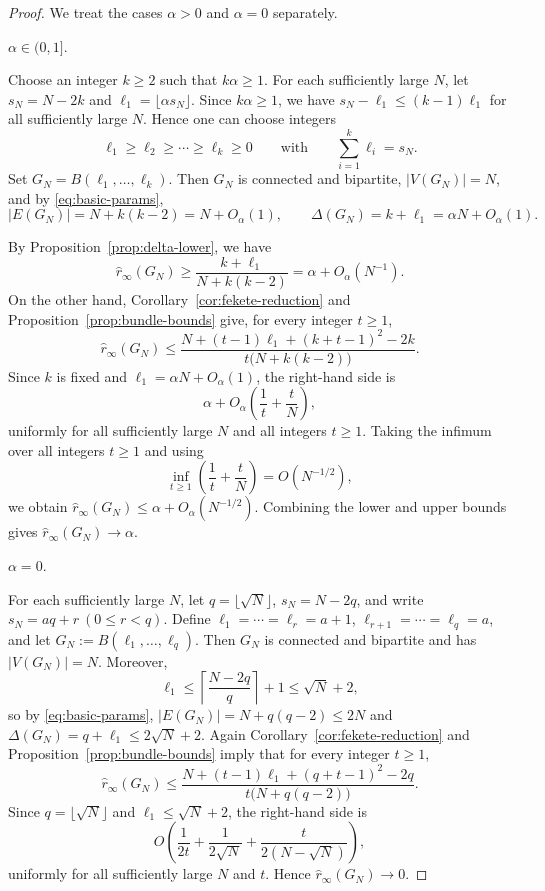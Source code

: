 \documentclass[10pt,a4paper]{amsart}
\newcommand{\sri}{\hat r_{\infty}}
\begin{document}
\begin{proof}
We treat the cases $\alpha>0$ and $\alpha=0$ separately.
\setcounter{case}{0}
\begin{case}
$\alpha\in(0,1]$.    
\end{case}

Choose an integer $k\ge 2$ such that $k\alpha \geq 1$. For each sufficiently large $N$, let
$s_N=N-2k$ and 
$\ell_1=\lfloor \alpha s_N\rfloor$.
Since $k\alpha \geq 1$, we have $s_N-\ell_1\le (k-1)\ell_1$ for all sufficiently large $N$. Hence
one can choose integers
\[
\ell_1\ge \ell_2\ge \cdots\ge \ell_k\ge 0
\qquad\text{with}\qquad
\sum_{i=1}^k\ell_i=s_N.
\]
Set
$G_N=B(\ell_1,\dots,\ell_k)$.
Then $G_N$ is connected and bipartite, $|V(G_N)|=N$, and by \eqref{eq:basic-params},
\[
|E(G_N)|=N+k(k-2)=N+O_{\alpha}(1),
\qquad
\Delta(G_N)=k+\ell_1=\alpha N+O_{\alpha}(1).
\]

By Proposition~\ref{prop:delta-lower}, we have 
\[
\sri(G_N)\ge \frac{k+\ell_1}{N+k(k-2)}=\alpha+O_{\alpha}(N^{-1}).
\]
On the other hand, Corollary~\ref{cor:fekete-reduction} and
Proposition~\ref{prop:bundle-bounds} give, for every integer $t\ge 1$,
\[
\sri(G_N)
\le
\frac{N+(t-1)\ell_1+(k+t-1)^2-2k}{t\bigl(N+k(k-2)\bigr)}.
\]
Since $k$ is fixed and $\ell_1=\alpha N+O_{\alpha}(1)$, the right-hand side is
\[
\alpha+O_{\alpha}\!\left(\frac{1}{t}+\frac{t}{N}\right),
\]
uniformly for all sufficiently large $N$ and all integers $t\ge 1$. Taking the infimum over
all integers $t\ge 1$ and using
\[
\inf_{t\ge 1}\left(\frac{1}{t}+\frac{t}{N}\right)=O(N^{-1/2}),
\]
we obtain
$\sri(G_N)\le \alpha+O_{\alpha}(N^{-1/2})$.
Combining the lower and upper bounds gives $\sri(G_N)\to\alpha$.

\begin{case}
$\alpha=0$.   
\end{case}

For each sufficiently large $N$, let
$q=\lfloor \sqrt N\rfloor$,
$s_N=N-2q$,
and write
$s_N=aq+r
~(0\le r<q)$.
Define
$\ell_1=\cdots=\ell_r=a+1$,
$\ell_{r+1}=\cdots=\ell_q=a$,
and let
$G_N:=B(\ell_1,\dots,\ell_q)$.
Then $G_N$ is connected and bipartite and has $|V(G_N)|=N$. Moreover,
\[
\ell_1\le \left\lceil\frac{N-2q}{q}\right\rceil +1\le \sqrt N+2,
\]
so by \eqref{eq:basic-params},
$|E(G_N)|=N+q(q-2)\le 2N$ and 
$\Delta(G_N)=q+\ell_1\le 2\sqrt N+2$.
Again Corollary~\ref{cor:fekete-reduction} and
Proposition~\ref{prop:bundle-bounds} imply that for every integer $t\ge 1$,
\[
\sri(G_N)
\le
\frac{N+(t-1)\ell_1+(q+t-1)^2-2q}{t\bigl(N+q(q-2)\bigr)}.
\]
Since $q=\lfloor\sqrt N\rfloor$ and $\ell_1\le \sqrt N+2$, the right-hand side is
\[
O\!\left(\frac{1}{2t}+\frac{1}{2\sqrt N}+\frac{t}{2(N-\sqrt N)}\right),
\]
uniformly for all sufficiently large $N$ and $t$.
Hence $\sri(G_N)\to 0$.
\end{proof}
\end{document}
